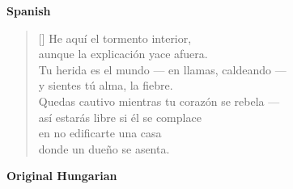 \documentclass[a4paper,12pt,twoside,final]{book}
\begin{document}
\bigskip

\noindent \textbf{Spanish}


\settowidth{\versewidth}{Tu herida es el mundo --- en llamas, caldeando ---}

\begin{verse}[\versewidth]
  He aquí el tormento interior, \\
  aunque la explicación yace afuera. \\
  Tu herida es el mundo --- en llamas, caldeando --- \\
  y sientes tú alma, la fiebre. \\
  Quedas cautivo mientras tu corazón se rebela --- \\
  así estarás libre si él se complace \\
  en no edificarte una casa \\
  donde un dueño se asenta. \\
\end{verse}

\newpage


\noindent \textbf{Original Hungarian}



\settowidth{\versewidth}{nem raksz magadnak olyan házat,}
\end{document}
